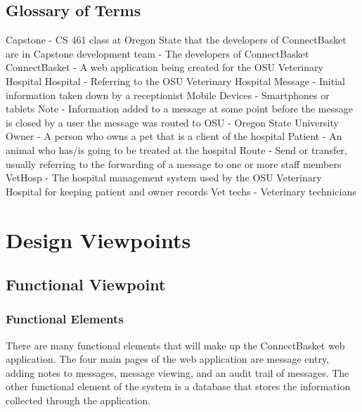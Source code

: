 \documentclass[onecolumn, draftclsnofoot,10pt, compsoc]{IEEEtran}
\begin{document}
\subsection{Glossary of Terms}
Capstone - CS 461 class at Oregon State that the developers of ConnectBasket are in \newline
Capstone development team - The developers of ConnectBasket\newline
ConnectBasket - A web application being created for the OSU Veterinary Hospital\newline
Hospital - Referring to the OSU Veterinary Hospital\newline
Message - Initial information taken down by a receptionist\newline
Mobile Devices - Smartphones or tablets\newline
Note - Information added to a message at some point before the message is closed by a user the message was routed to\newline
OSU - Oregon State University\newline
Owner - A person who owns a pet that is a client of the hospital\newline
Patient - An animal who has/is going to be treated at the hospital \newline
Route - Send or transfer, usually referring to the forwarding of a message to one or more staff members\newline
VetHosp - The hospital management system used by the OSU Veterinary Hospital for keeping patient and owner records\newline
Vet techs - Veterinary technicians

\section{Design Viewpoints}

\subsection{Functional Viewpoint}

\subsubsection{Functional Elements}
There are many functional elements that will make up the ConnectBasket web application. The four main pages of the web application are message entry, adding notes to messages, message viewing, and an audit trail of messages. The other functional element of the system is a database that stores the information collected through the application.
\end{document}
